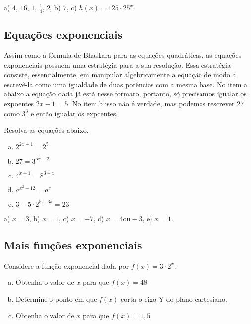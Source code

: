 \documentclass[main.tex]{subfiles}
\begin{document}
\begin{gabarito}
	\begin{gabaritoQuestao}
		a) $4$, $16$, $1$, $\frac{1}{4}$, $2$, b) $7$, c) $h(x)=125 \cdot 25^x$.
	\end{gabaritoQuestao}
\end{gabarito}


\subsection*{Equações exponenciais}

Assim como a fórmula de Bhaskara para as equações quadráticas, as equações exponenciais possuem uma estratégia para a sua resolução. Essa estratégia consiste, essencialmente, em manipular algebricamente a equação de modo a escrevê-la como uma igualdade de duas potências com a mesma base. No item a abaixo a equação dada já está nesse formato, portanto, só precisamos igualar os expoentes $2x-1=5$. No item b isso não é verdade, mas podemos rescrever $27$ como $3^3$ e então igualar os expoentes.

\begin{questao}
Resolva as equações abaixo.
\begin{enumerate}[a)]
\item $2^{2x-1} = 2^5$
\item $27 = 3^{5x-2}$
\item $4^{x+1}=8^{3+x}$
\item $a^{x^2-12}=a^{x}$
\item $3-5 \cdot 2^{5-3x} = 23$
\end{enumerate}
\end{questao}

\begin{gabarito}
	\begin{gabaritoQuestao}
		a) $x=3$, b) $x=1$, c) $x=-7$, d) $x=4 \text{ou} -3$, e) $x=1$.
	\end{gabaritoQuestao}
\end{gabarito}



\subsection*{Mais funções exponenciais}

\begin{questao}
Considere a função exponencial dada por $f(x)=3 \cdot 2^x$.
\begin{enumerate}[a)]
\item Obtenha o valor de $x$ para que $f(x)=48$
\item Determine o ponto em que $f(x)$ corta o eixo Y do plano cartesiano.
\item Obtenha o valor de $x$ para que $f(x)=1,5$
\end{enumerate}
\end{questao}
\end{document}
